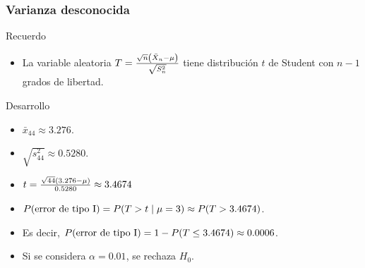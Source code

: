 \documentclass[table]{beamer}
\begin{document}
\begin{frame}
    \frametitle{Varianza desconocida}
    \begin{block}{Recuerdo}
        \begin{itemize}
            \item La variable aleatoria $T = \frac{\sqrt{n} \parens{\bar{X}_{n} - \mu}}{\sqrt{S^{2}_{n}}}$ tiene distribución $t$ de Student con $n - 1$ grados de libertad.
        \end{itemize}
    \end{block}
    \begin{block}{Desarrollo}
        \begin{itemize}
            \item $\bar{x}_{44} \approx 3.276$.
            \item $\sqrt{s^{2}_{44}} \approx 0.5280$.
            \item $t = \frac{\sqrt{44} \parens{3.276 - \mu}}{0.5280} \approx 3.4674$
            \item $\prob{\text{error de tipo I}} = \prob{T > t \mid \mu = 3} \approx \prob{T > 3.4674}$.
            \item Es decir, $\prob{\text{error de tipo I}} = 1 - \prob{T \leq 3.4674} \approx 0.0006$.
            \item Si se considera $\alpha = 0.01$, se rechaza $H_{0}$.
        \end{itemize}
    \end{block}
\end{frame}
\end{document}
